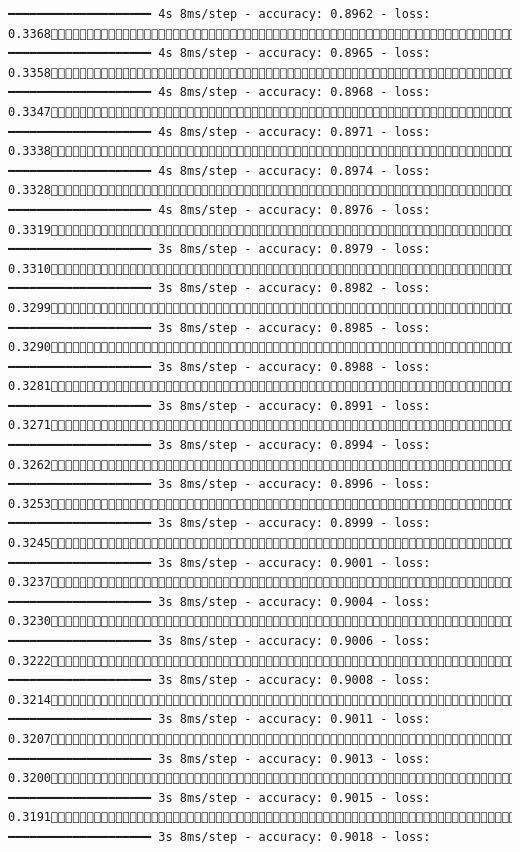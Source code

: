 \documentclass[
  letterpaper,
  DIV=11,
  numbers=noendperiod]{scrreprt}
\begin{document}
\begin{verbatim}
━━━━━━━━━━━━━━━━━━━━ 4s 8ms/step - accuracy: 0.8962 - loss: 0.33681337/1875 ━━━━━━━━━━━━━━━━━━━━ 4s 8ms/step - accuracy: 0.8965 - loss: 0.33581345/1875 ━━━━━━━━━━━━━━━━━━━━ 4s 8ms/step - accuracy: 0.8968 - loss: 0.33471352/1875 ━━━━━━━━━━━━━━━━━━━━ 4s 8ms/step - accuracy: 0.8971 - loss: 0.33381359/1875 ━━━━━━━━━━━━━━━━━━━━ 4s 8ms/step - accuracy: 0.8974 - loss: 0.33281366/1875 ━━━━━━━━━━━━━━━━━━━━ 4s 8ms/step - accuracy: 0.8976 - loss: 0.33191373/1875 ━━━━━━━━━━━━━━━━━━━━ 3s 8ms/step - accuracy: 0.8979 - loss: 0.33101381/1875 ━━━━━━━━━━━━━━━━━━━━ 3s 8ms/step - accuracy: 0.8982 - loss: 0.32991388/1875 ━━━━━━━━━━━━━━━━━━━━ 3s 8ms/step - accuracy: 0.8985 - loss: 0.32901395/1875 ━━━━━━━━━━━━━━━━━━━━ 3s 8ms/step - accuracy: 0.8988 - loss: 0.32811403/1875 ━━━━━━━━━━━━━━━━━━━━ 3s 8ms/step - accuracy: 0.8991 - loss: 0.32711410/1875 ━━━━━━━━━━━━━━━━━━━━ 3s 8ms/step - accuracy: 0.8994 - loss: 0.32621417/1875 ━━━━━━━━━━━━━━━━━━━━ 3s 8ms/step - accuracy: 0.8996 - loss: 0.32531424/1875 ━━━━━━━━━━━━━━━━━━━━ 3s 8ms/step - accuracy: 0.8999 - loss: 0.32451430/1875 ━━━━━━━━━━━━━━━━━━━━ 3s 8ms/step - accuracy: 0.9001 - loss: 0.32371436/1875 ━━━━━━━━━━━━━━━━━━━━ 3s 8ms/step - accuracy: 0.9004 - loss: 0.32301442/1875 ━━━━━━━━━━━━━━━━━━━━ 3s 8ms/step - accuracy: 0.9006 - loss: 0.32221449/1875 ━━━━━━━━━━━━━━━━━━━━ 3s 8ms/step - accuracy: 0.9008 - loss: 0.32141455/1875 ━━━━━━━━━━━━━━━━━━━━ 3s 8ms/step - accuracy: 0.9011 - loss: 0.32071461/1875 ━━━━━━━━━━━━━━━━━━━━ 3s 8ms/step - accuracy: 0.9013 - loss: 0.32001468/1875 ━━━━━━━━━━━━━━━━━━━━ 3s 8ms/step - accuracy: 0.9015 - loss: 0.31911474/1875 ━━━━━━━━━━━━━━━━━━━━ 3s 8ms/step - accuracy: 0.9018 - loss: 
\end{verbatim}
\end{document}
